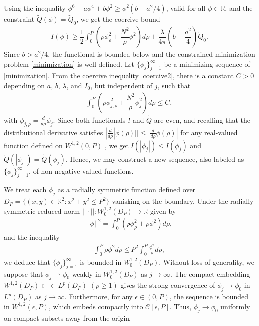 \documentclass[12pt]{article}
\begin{document}
	Using the inequality $\phi^6-a\phi^4+b\phi^2\geq\phi^2(b-a^2/4)$, valid for all $\phi\in\mathbb{R}$, and the constraint $\tilde{Q}(\phi)=\tilde{Q}_0$, we get the coercive bound
	\begin{align}
		I(\phi)\geq \dfrac{1}{2}\int_0^{P}\left(\rho\phi_{\rho}^2+\dfrac{N^2}{\rho}\phi^2\right)d\rho+\dfrac{\lambda }{4\pi}\left(b-\dfrac{a^2}{4}\right)\tilde{Q}_0.\label{coercive2}
	\end{align}
	Since $b > a^2/4$, the functional is bounded below and the constrained minimization problem \eqref{minimization} is well defined. Let $\{\phi_j\}_{j=1}^{\infty}$ be a minimizing sequence of \eqref{minimization}. From the coercive inequality \eqref{coercive2}, there is a constant $C>0$ depending on $a$, $b$, $\lambda$, and $I_0$, but independent of $j$, such that
	\begin{align}
		\int_0^{P}\left(\rho\phi_{j,\rho}^2+\dfrac{N^2}{\rho}\phi_j^2\right)d\rho\leq C,\label{Cbnd}
	\end{align}
	with $\phi_{j,\rho}=\frac{d}{d\rho}\phi_j$. Since both functionals $I$ and $\tilde{Q}$ are even, and recalling that the distributional derivative satisfies $|\frac{d}{d\rho}|\phi(\rho)||\leq|\frac{d}{d\rho}\phi(\rho)|$ for any real-valued function defined on $W^{1,2}(0,P)$ \cite{LiebLoss}, we get $I(|\phi_j|)\leq I(\phi_j)$ and $\tilde{Q}(|\phi_j|)=\tilde{Q}(\phi_j)$. Hence, we may construct a new sequence, also labeled as $\{\phi_j\}_{j=1}^{\infty}$, of non-negative valued functions.
	
	We treat each $\phi_j$ as a radially symmetric function defined over $D_P=\{(x,y)\in\mathbb{R}^2:x^2+y^2\leq P^2\}$ vanishing on the boundary. Under the radially symmetric reduced norm $||\cdot||:W^{1,2}_0(D_P)\rightarrow\mathbb{R}$ given by
	\begin{align}
		||\phi||^2=\int_0^P\left(\rho\phi_{\rho}^2+\rho\phi^2\right)d\rho,
	\end{align}
	and the inequality 
    \begin{align}
    \int_0^P\rho\phi^2d\rho\leq P^2\int_0^P\frac{\phi^2}{\rho}d\rho,
	\end{align}
	we deduce that $\{\phi_j\}_{j=1}^{\infty}$ is bounded in $W^{1,2}_0(D_P)$. Without loss of generality, we suppose that $\phi_j\rightharpoonup \phi_0$ weakly in $W^{1,2}_0(D_P)$ as $j\rightarrow\infty$.
	The compact embedding $W^{1,2}(D_P)\subset\subset L^p(D_P)$ $(p\geq 1)$ gives the strong convergence of $\phi_j\rightarrow\phi_0$ in $L^p(D_P)$ as $j\rightarrow\infty$. Furthermore, for any $\epsilon \in (0, P)$, the sequence is bounded in $W^{1,2}(\epsilon, P)$, which embeds compactly into $\mathcal{C}[\epsilon, P]$. Thus, $\phi_j \to \phi_0$ uniformly on compact subsets away from the origin.
	
\end{document}
